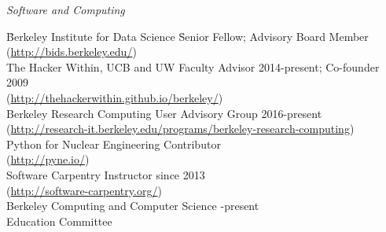 \vspace*{-.5em}
\textit{Software and Computing}
\begin{tabbing}
\hspace*{2 em}\= Berkeley Institute for Data Science \hspace*{6em} \= Senior Fellow; Advisory Board Member\\ 
\>\hspace*{2 em}(\href{http://bids.berkeley.edu/}{http://bids.berkeley.edu/}) \\
%
\> The Hacker Within, UCB and UW \> Faculty Advisor 2014-present; Co-founder 2009\\
\> \hspace*{2 em}(\href{http://thehackerwithin.github.io/berkeley/}{http://thehackerwithin.github.io/berkeley/})\\
%
\> Berkeley Research Computing  \> User Advisory Group 2016-present \\
\> \hspace*{2 em}(\href{http://research-it.berkeley.edu/programs/berkeley-research-computing}{http://research-it.berkeley.edu/programs/berkeley-research-computing})\\
%
\> Python for Nuclear Engineering  \> Contributor \\
\> \hspace*{2 em}(\href{http://pyne.io/}{http://pyne.io/})\\
%
\> Software Carpentry  \> Instructor since 2013\\
\> \hspace*{2 em}(\href{http://software-carpentry.org/}{http://software-carpentry.org/})\\
%
%
\> Berkeley Computing and Computer Science -present \\
\> \hspace*{2 em}Education Committee%
\end{tabbing}

